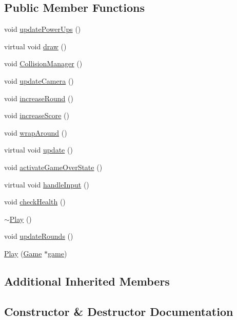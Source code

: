 \subsection*{Public Member Functions}
\begin{DoxyCompactItemize}
\item 
void \hyperlink{class_play_aa4cf498ba0e0f0d05305d749bd753137}{update\+Power\+Ups} ()
\item 
virtual void \hyperlink{class_play_a026d1354c1b7ac0df50b7108c78aec61}{draw} ()
\item 
void \hyperlink{class_play_a3dbdeaf231718f05feac075aa4902175}{Collision\+Manager} ()
\item 
void \hyperlink{class_play_a321efb6f8d02dc3695404b33c22e9285}{update\+Camera} ()
\item 
void \hyperlink{class_play_a053a009efbee3c190b2d8449a751fbae}{increase\+Round} ()
\item 
void \hyperlink{class_play_af923e24bb8d24800e6481b18ce6f1e7b}{increase\+Score} ()
\item 
void \hyperlink{class_play_adaec4a516b2e9317d01d6c7fc255e7ee}{wrap\+Around} ()
\item 
virtual void \hyperlink{class_play_a8eaa457d009e35bfbf699b38b569e3b8}{update} ()
\item 
void \hyperlink{class_play_ab99107a51dbbc3b2f5ef9a9549944574}{activate\+Game\+Over\+State} ()
\item 
virtual void \hyperlink{class_play_a81bdbd1ef7b3de50dba1a8ebf346a1fc}{handle\+Input} ()
\item 
void \hyperlink{class_play_a75c96673011616e5c97731870ddb649e}{check\+Health} ()
\item 
\hyperlink{class_play_a6f7dd4d097454caef2e81fa94fe739d5}{$\sim$\+Play} ()
\item 
void \hyperlink{class_play_a3d795242eee0deb5e772e3cc85988829}{update\+Rounds} ()
\item 
\hyperlink{class_play_a84bc1e86dc4368356228523315d4dac9}{Play} (\hyperlink{class_game}{Game} $\ast$\hyperlink{class_game_state_a355a79415b9ef63c2aec1448a99f6e71}{game})
\end{DoxyCompactItemize}
\subsection*{Additional Inherited Members}


\subsection{Constructor \& Destructor Documentation}
\mbox{\label{class_play_a6f7dd4d097454caef2e81fa94fe739d5}} 
